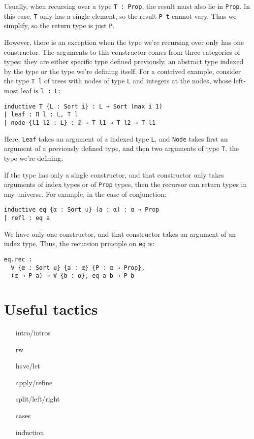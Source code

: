 \documentclass[a4paper, 12pt]{article}
\newcommand{\lean}[1]{\texttt{#1}}
\theoremstyle{changedot}
\theoremstyle{changedotbreak}
\theoremstyle{nonumberplain}
\begin{document}
Usually, when recursing over a type \lean{T : Prop}, the result must also lie in \lean{Prop}. In this case, \lean{T} only has a single element, so the result \lean{P t} cannot vary. Thus we simplify, so the return type is just \lean{P}.

However, there is an exception when the type we're recursing over only has one constructor. The arguments to this constructor comes from three categories of types: they are either specific type defined previously, an abstract type indexed by the type or the type we're defining itself. For a contrived example, consider the type \lean{T l} of trees with nodes of type \lean{L} and integers at the nodes, whose left-most leaf is \lean{l : L}:
\begin{verbatim}
inductive T {L : Sort i} : L → Sort (max i 1)
| leaf : Π l : L, T l
| node {l1 l2 : L} : ℤ → T l1 → T l2 → T l1
\end{verbatim}
Here, \lean{Leaf} takes an argument of a indexed type \lean{L}, and \lean{Node} takes first an argument of a previously defined type, and then two arguments of type \lean{T}, the type we're defining.

If the type has only a single constructor, and that constructor only takes arguments of index types or of \lean{Prop} types, then the recursor can return types in any universe. For example, in the case of conjunction:

\begin{verbatim}
inductive eq {α : Sort u} (a : α) : α → Prop
| refl : eq a
\end{verbatim}

We have only one constructor, and that constructor takes an argument of an index type. Thus, the recursion principle on \lean{eq} is:
\begin{verbatim}
eq.rec :
  ∀ {α : Sort u} {a : α} {P : α → Prop},
  (α → P a) → ∀ {b : α}, eq a b → P b
\end{verbatim}


\section{Useful tactics}
\begin{itemize}
  \item[intro/intros]
  \item[rw]
  \item[have/let]
  \item[apply/refine]
  \item[split/left/right]
  \item[cases]
  \item[induction]
\end{itemize}
\end{document}
